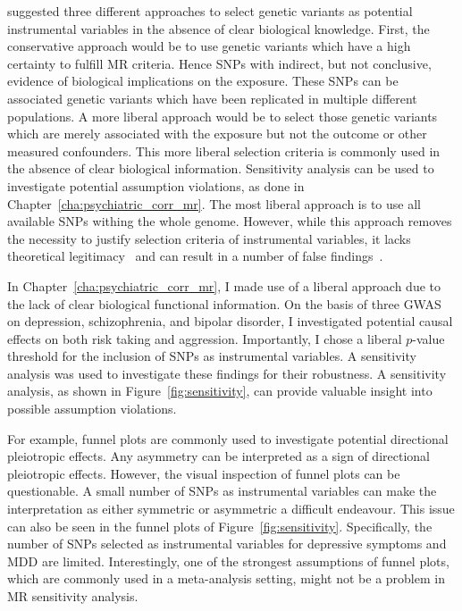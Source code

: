 \citet{Burgess2016a} suggested three different approaches to select genetic variants as potential instrumental  variables in the absence of clear biological knowledge.
First, the conservative approach would be to use genetic variants which have a high certainty to fulfill MR criteria.
Hence SNPs with indirect, but not conclusive, evidence of biological implications on the exposure.
These SNPs can be associated genetic variants which have been replicated in multiple different populations.
A more liberal approach would be to select those genetic variants which are merely associated with the exposure but not the outcome or other measured confounders.
This more liberal selection criteria is commonly used in the absence of clear biological information.
Sensitivity analysis can be used to investigate potential assumption violations, as done in Chapter~\ref{cha:psychiatric_corr_mr}.
The most liberal approach is to use all available SNPs withing the whole genome.
However, while this approach removes the necessity to justify  selection criteria of instrumental variables, it lacks theoretical legitimacy~\cite{Burgess2016a} and can result in a number of false findings~\cite{Evans2013}.

In Chapter~\ref{cha:psychiatric_corr_mr}, I made use of a liberal approach due to the lack of clear biological functional information.
On the basis of three GWAS on depression, schizophrenia, and bipolar disorder, I investigated potential causal effects on both risk taking and aggression.
Importantly, I chose a liberal $p$-value threshold for the inclusion of SNPs as instrumental variables.
A sensitivity analysis was used to investigate these findings for their robustness.
A sensitivity analysis, as shown in Figure~\ref{fig:sensitivity}, can provide valuable insight into possible assumption violations.

For example, funnel plots are commonly used to investigate potential directional pleiotropic effects.
Any asymmetry can be interpreted as a sign of directional pleiotropic effects.
However, the visual inspection of funnel plots can be questionable.
A small number of  SNPs as instrumental variables can make the interpretation as either symmetric or asymmetric a difficult endeavour. 
This issue can also be seen in the funnel plots of Figure~\ref{fig:sensitivity}.
Specifically, the number of SNPs selected as instrumental variables for depressive symptoms and MDD are limited. 
Interestingly, one of the strongest assumptions of funnel plots, which are commonly used in a meta-analysis setting, might not be a problem in MR sensitivity analysis.

